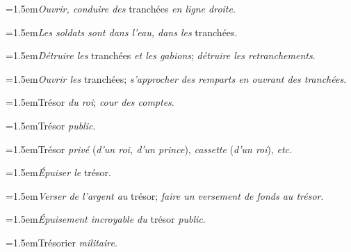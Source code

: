\par{\dictfontsize\hangindent=1.5em\noindent \textit{Ouvrir, conduire des} tranchées \textit{en ligne droite}. \par}
\par{\dictfontsize\hangindent=1.5em\noindent \textit{Les soldats sont dans l’eau, dans les} tranchées. \par}
\par{\dictfontsize\hangindent=1.5em\noindent \textit{Détruire les} tranchées \textit{et les gabions}; \textit{détruire les retranchements}. \par}
\par{\dictfontsize\hangindent=1.5em\noindent \textit{Ouvrir les} tranchées; \textit{s’approcher des remparts en ouvrant des tranchées}. \par}
\par{\dictfontsize\hangindent=1.5em\noindent Trésor \textit{du roi}; \textit{cour des comptes}. \par}
\par{\dictfontsize\hangindent=1.5em\noindent Trésor \textit{public}. \par}
\par{\dictfontsize\hangindent=1.5em\noindent Trésor \textit{privé} (\textit{d’un roi, d’un prince}), \textit{cassette} (\textit{d’un roi}), \textit{etc.} \par}
\par{\dictfontsize\hangindent=1.5em\noindent \textit{Épuiser le} trésor. \par}
\par{\dictfontsize\hangindent=1.5em\noindent \textit{Verser de l’argent au} trésor; \textit{faire un versement de fonds au trésor}. \par}
\par{\dictfontsize\hangindent=1.5em\noindent \textit{Épuisement incroyable du} trésor \textit{public}. \par}
\par{\dictfontsize\hangindent=1.5em\noindent Trésorier \textit{militaire}. \par}
